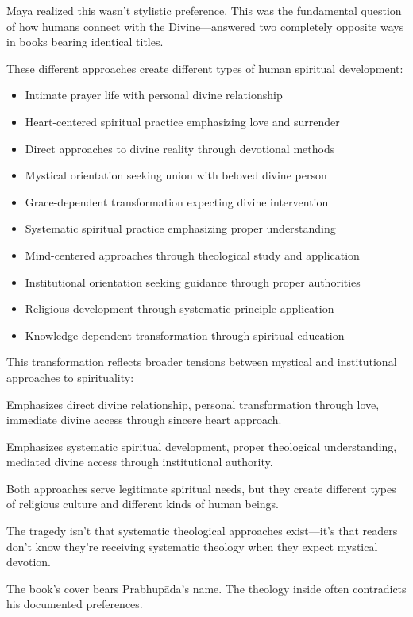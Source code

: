 \documentclass[12pt,twoside]{book}
\begin{document}
Maya realized this wasn't stylistic preference. This was the fundamental question of how humans connect with the Divine—answered two completely opposite ways in books bearing identical titles.

These different approaches create different types of human spiritual development:

\begin{itemize}
\item Intimate prayer life with personal divine relationship
\item Heart-centered spiritual practice emphasizing love and surrender
\item Direct approaches to divine reality through devotional methods
\item Mystical orientation seeking union with beloved divine person
\item Grace-dependent transformation expecting divine intervention

\item Systematic spiritual practice emphasizing proper understanding
\item Mind-centered approaches through theological study and application
\item Institutional orientation seeking guidance through proper authorities
\item Religious development through systematic principle application
\item Knowledge-dependent transformation through spiritual education
\end{itemize}

This transformation reflects broader tensions between mystical and institutional approaches to spirituality:

Emphasizes direct divine relationship, personal transformation through love, immediate divine access through sincere heart approach.

Emphasizes systematic spiritual development, proper theological understanding, mediated divine access through institutional authority.

Both approaches serve legitimate spiritual needs, but they create different types of religious culture and different kinds of human beings.

The tragedy isn't that systematic theological approaches exist—it's that readers don't know they're receiving systematic theology when they expect mystical devotion.

The book's cover bears Prabhupāda's name. The theology inside often contradicts his documented preferences.
\end{document}
